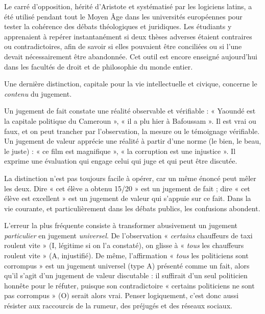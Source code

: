 \documentclass[11pt]{article}
\newcommand{\cle}[1]{{\popxbold\color{popdark}#1}}
\newcounter{popsec}
\newcounter{popsub}
\newcommand{\courssub}[1]{%
  \stepcounter{popsub}%
  \par\vspace{9pt}\noindent{\popxbold\fontsize{11.5}{13}\selectfont\color{popink}{\color{poporange}\thepopsec.\thepopsub}\hspace{6pt}#1}\par\nopagebreak\vspace{4pt}
}
\begin{document}
\begin{savaistu}
Le carré d'opposition, hérité d'Aristote et systématisé par les logiciens latins, a été utilisé pendant tout le Moyen Âge dans les universités européennes pour tester la cohérence des débats théologiques et juridiques. Les étudiants y apprenaient à repérer instantanément si deux thèses adverses étaient contraires ou contradictoires, afin de savoir si elles pouvaient être conciliées ou si l'une devait nécessairement être abandonnée. Cet outil est encore enseigné aujourd'hui dans les facultés de droit et de philosophie du monde entier.
\end{savaistu}

\courssub{Jugements de fait et jugements de valeur}

Une dernière distinction, capitale pour la vie intellectuelle et civique, concerne le \emph{contenu} du jugement.

\begin{definition}
Un \cle{jugement de fait} constate une réalité observable et vérifiable : « Yaoundé est la capitale politique du Cameroun », « il a plu hier à Bafoussam ». Il est vrai ou faux, et on peut trancher par l'observation, la mesure ou le témoignage vérifiable. Un \cle{jugement de valeur} apprécie une réalité à partir d'une norme (le bien, le beau, le juste) : « ce film est magnifique », « la corruption est une injustice ». Il exprime une évaluation qui engage celui qui juge et qui peut être discutée.
\end{definition}

La distinction n'est pas toujours facile à opérer, car un même énoncé peut mêler les deux. Dire « cet élève a obtenu 15/20 » est un jugement de fait ; dire « cet élève est excellent » est un jugement de valeur qui s'appuie sur ce fait. Dans la vie courante, et particulièrement dans les débats publics, les confusions abondent.

\begin{attention}
L'erreur la plus fréquente consiste à transformer abusivement un jugement \emph{particulier} en jugement \emph{universel}. De l'observation « \emph{certains} chauffeurs de taxi roulent vite » (I, légitime si on l'a constaté), on glisse à « \emph{tous} les chauffeurs roulent vite » (A, injustifié). De même, l'affirmation « \emph{tous} les politiciens sont corrompus » est un jugement universel (type A) présenté comme un fait, alors qu'il s'agit d'un jugement de valeur discutable : il suffirait d'un seul politicien honnête pour le réfuter, puisque son contradictoire « certains politiciens ne sont pas corrompus » (O) serait alors vrai. Penser logiquement, c'est donc aussi résister aux raccourcis de la rumeur, des préjugés et des réseaux sociaux.
\end{attention}
\end{document}
